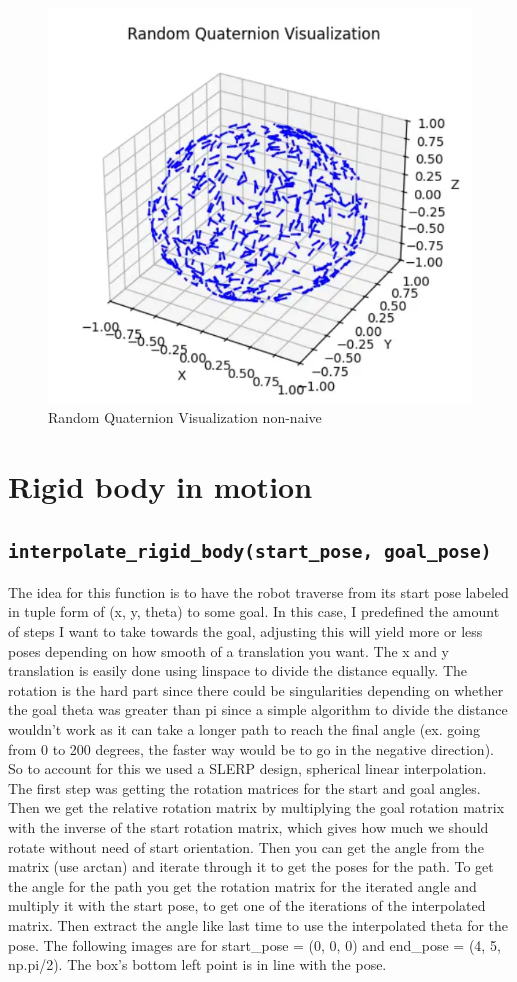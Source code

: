 \documentclass{article}
\begin{document}
\begin{figure} [H]
    \centering
    \includegraphics[width=0.5\linewidth]{latex_media/component_2_random_q_nonnaive.png}
    \caption{Random Quaternion Visualization non-naive}
\end{figure}
\section{Rigid body in motion}


\subsection{\texttt{interpolate\_rigid\_body(start\_pose, goal\_pose)}}

The idea for this function is to have the robot traverse from its start pose labeled in tuple form of (x, y, theta) to some goal. In this case, I predefined the amount of steps I want to take towards the goal, adjusting this will yield more or less poses depending on how smooth of a translation you want. The x and y translation is easily done using linspace to divide the distance equally. The rotation is the hard part since there could be singularities depending on whether the goal theta was greater than pi since a simple algorithm to divide the distance wouldn't work as it can take a longer path to reach the final angle (ex. going from 0 to 200 degrees, the faster way would be to go in the negative direction). So to account for this we used a SLERP design, spherical linear interpolation. The first step was getting the rotation matrices for the start and goal angles. Then we get the relative rotation matrix by multiplying the goal rotation matrix with the inverse of the start rotation matrix, which gives how much we should rotate without need of start orientation. Then you can get the angle from the matrix (use arctan) and iterate through it to get the poses for the path. To get the angle for the path you get the rotation matrix for the iterated angle and multiply it with the start pose, to get one of the iterations of the interpolated matrix. Then extract the angle like last time to use the interpolated theta for the pose. The following images are for start\_pose =  (0, 0, 0) and end\_pose = (4, 5, np.pi/2). The box's bottom left point is in line with the pose.
\end{document}
